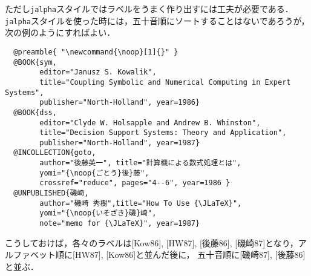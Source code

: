\begin{enumerate}
ただし{\tt jalpha}スタイルではラベルをうまく作り出すには工夫が必要である．
{\tt jalpha}スタイルを使った時には，五十音順にソートすることはないであろうが，
次の例のようにすればよい．

{\baselineskip=11pt
\begin{verbatim}
  @preamble{ "\newcommand{\noop}[1]{}" }
  @BOOK{sym,
        editor="Janusz S. Kowalik",
        title="Coupling Symbolic and Numerical Computing in Expert Systems",
        publisher="North-Holland", year=1986}
  @BOOK{dss,
        editor="Clyde W. Holsapple and Andrew B. Whinston",
        title="Decision Support Systems: Theory and Application",
        publisher="North-Holland", year=1987}
  @INCOLLECTION{goto,
        author="後藤英一", title="計算機による数式処理とは",
        yomi="{\noop{ごとう}後}藤",
        crossref="reduce", pages="4--6", year=1986 }
  @UNPUBLISHED{磯崎,
        author="磯崎 秀樹",title="How To Use {\JLaTeX}",
        yomi="{\noop{いそざき}磯}崎",
        note="memo for {\JLaTeX}", year=1987}
\end{verbatim}
}

こうしておけば，各々のラベルは[Kow86], [HW87], 
[後藤86], [磯崎87]となり，アルファベット順に[HW87], [Kow86]と並んだ後に，
五十音順に[磯崎87], [後藤86]と並ぶ．
\end{enumerate}




